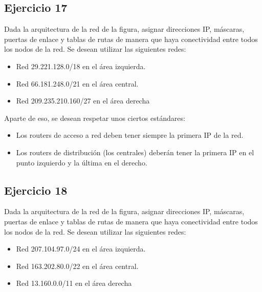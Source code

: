 \documentclass[letterpaper,10pt,spanish]{sphinxmanual}
\begin{document}
\subsection{Ejercicio 17}
\label{\detokenize{t2_integracion_elementos/ejercicios_subredes_ipv4/ejercicios_dos_router:ejercicio-17}}
\sphinxAtStartPar
Dada la arquitectura de la red de la figura, asignar direcciones IP, máscaras, puertas de enlace y tablas de rutas de manera que haya conectividad entre todos
los nodos de la red. Se desean utilizar las siguientes redes:
\begin{itemize}
\item {} 
\sphinxAtStartPar
Red 29.221.128.0/18 en el área izquierda.

\item {} 
\sphinxAtStartPar
Red 66.181.248.0/21 en el área central.

\item {} 
\sphinxAtStartPar
Red 209.235.210.160/27 en el área derecha

\end{itemize}

\begin{figure}[htbp]
\centering

\noindent{}
\end{figure}

\sphinxAtStartPar
Aparte de eso, se desean respetar unos ciertos estándares:
\begin{itemize}
\item {} 
\sphinxAtStartPar
Los routers de acceso a red deben tener siempre la primera IP de la red.

\item {} 
\sphinxAtStartPar
Los routers de distribución (los centrales) deberán tener la primera IP en el punto izquierdo y la última en el derecho.

\end{itemize}


\subsection{Ejercicio 18}
\label{\detokenize{t2_integracion_elementos/ejercicios_subredes_ipv4/ejercicios_dos_router:ejercicio-18}}
\sphinxAtStartPar
Dada la arquitectura de la red de la figura, asignar direcciones IP, máscaras, puertas de enlace y tablas de rutas de manera que haya conectividad entre todos
los nodos de la red. Se desean utilizar las siguientes redes:
\begin{itemize}
\item {} 
\sphinxAtStartPar
Red 207.104.97.0/24 en el área izquierda.

\item {} 
\sphinxAtStartPar
Red 163.202.80.0/22 en el área central.

\item {} 
\sphinxAtStartPar
Red 13.160.0.0/11 en el área derecha

\end{itemize}
\end{document}
